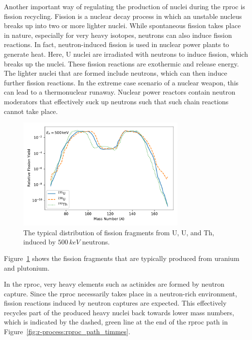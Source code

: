 Another important way of regulating the production of nuclei during the \ac{rproc} is fission recycling. Fission is a nuclear decay process in which an unstable nucleus breaks up into two or more lighter nuclei. While spontaneous fission takes place in nature, especially for very heavy isotopes, neutrons can also induce fission reactions. In fact, neutron-induced fission is used in nuclear power plants to generate heat. Here, U nuclei are irradiated with neutrons to induce fission, which breaks up the nuclei. These fission reactions are exothermic and release energy. The lighter nuclei that are formed include neutrons, which can then induce further fission reactions. In the extreme case scenario of a nuclear weapon, this can lead to a thermonuclear runaway. Nuclear power reactors contain neutron moderators that effectively suck up neutrons such that such chain reactions cannot take place.
\begin{figure}[tb]
    \centering
    \includegraphics[width=0.75\textwidth]{graphics/r-process/fission_yield}
    \caption{The typical distribution of fission fragments from U, U, and Th, induced by $500\,keV$ neutrons.}
    \label{fig:r-process:fission_fragments}
\end{figure}
Figure~\ref{fig:r-process:fission_fragments} shows the fission fragments that are typically produced from uranium and plutonium. 

In the \ac{rproc}, very heavy elements such as actinides are formed by neutron capture. Since the \ac{rproc} necessarily takes place in a neutron-rich environment, fission reactions induced by neutron captures are expected. This effectively recycles part of the produced heavy nuclei back towards lower mass numbers, which is indicated by the dashed, green line at the end of the \ac{rproc} path in Figure~\ref{fig:r-process:rproc_path_timmes}.



